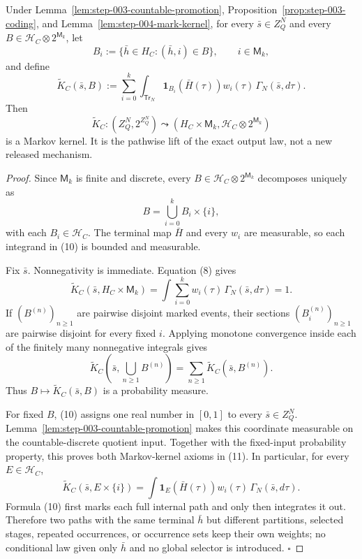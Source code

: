 \begin{proposition}\label{prop:step-004-lift}
Under Lemma~\ref{lem:step-003-countable-promotion}, Proposition~\ref{prop:step-003-coding}, and
Lemma~\ref{lem:step-004-mark-kernel}, for every
\(\bar s\in Z_Q^N\) and every
\(B\in\mathcal H_C\otimes2^{\mathsf M_k}\), let
\[
B_i:=\{\bar h\in H_C:(\bar h,i)\in B\},
\qquad i\in\mathsf M_k,
\tag{9}
\]
and define
\[
\widetilde K_C(\bar s,B)
:=\sum_{i=0}^k
\int_{\mathsf{Tr}_N}
\mathbf1_{B_i}(\bar H(\tau))w_i(\tau)
\,\Gamma_N(\bar s,d\tau).
\tag{10}
\]
Then
\[
\widetilde K_C:
(Z_Q^N,2^{Z_Q^N})
\leadsto
(H_C\times\mathsf M_k,
 \mathcal H_C\otimes2^{\mathsf M_k})
\tag{11}
\]
is a Markov kernel. It is the pathwise lift of the exact output law, not a
new released mechanism.


\end{proposition}

\begin{proof}
Since \(\mathsf M_k\) is finite and discrete, every
\(B\in\mathcal H_C\otimes2^{\mathsf M_k}\) decomposes uniquely as
\[
B=\bigcup_{i=0}^k B_i\times\{i\},
\tag{12}
\]
with each \(B_i\in\mathcal H_C\). The terminal map \(\bar H\) and every
\(w_i\) are measurable, so each integrand in (10) is bounded and
measurable.

Fix \(\bar s\). Nonnegativity is immediate. Equation (8) gives
\[
\widetilde K_C(\bar s,H_C\times\mathsf M_k)
=\int\sum_{i=0}^k w_i(\tau)\,
  \Gamma_N(\bar s,d\tau)=1.
\tag{13}
\]
If \((B^{(n)})_{n\geq1}\) are pairwise disjoint marked events, their
sections \((B_i^{(n)})_{n\geq1}\) are pairwise disjoint for every fixed
\(i\). Applying monotone convergence inside each of the finitely many
nonnegative integrals gives
\[
\widetilde K_C\!\left(\bar s,\bigcup_{n\geq1}B^{(n)}\right)
=\sum_{n\geq1}\widetilde K_C(\bar s,B^{(n)}).
\tag{14}
\]
Thus \(B\mapsto\widetilde K_C(\bar s,B)\) is a probability measure.

For fixed \(B\), (10) assigns one real number in \([0,1]\) to every
\(\bar s\in Z_Q^N\). Lemma~\ref{lem:step-003-countable-promotion} makes this coordinate
measurable on the countable-discrete quotient input. Together with the
fixed-input probability property, this proves both Markov-kernel axioms in
(11). In particular, for every \(E\in\mathcal H_C\),
\[
\widetilde K_C(\bar s,E\times\{i\})
=\int\mathbf1_E(\bar H(\tau))w_i(\tau)
\,\Gamma_N(\bar s,d\tau).
\tag{15}
\]
Formula (10) first marks each full internal path and only then integrates it
out. Therefore two paths with the same terminal \(\bar h\) but different
partitions, selected stages, repeated occurrences, or occurrence sets keep
their own weights; no conditional law given only \(\bar h\) and no global
selector is introduced. \(\square\)


\end{proof}


